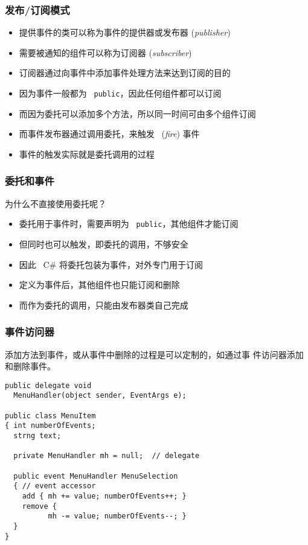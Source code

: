 \begin{frame}
\frametitle{发布/订阅模式}
\begin{itemize}
\item 提供事件的类可以称为事件的提供器或发布器 (\textit{publisher})
\item 需要被通知的组件可以称为订阅器 (\textit{subscriber})
\end{itemize}
\bigskip \pause
\begin{itemize}
\setlength{\itemsep}{4pt plus 1pt}
\item 订阅器通过向事件中添加事件处理方法来达到订阅的目的
\item 因为事件一般都为 ~\texttt{public}，因此任何组件都可以订阅
\item 而因为委托可以添加多个方法，所以同一时间可由多个组件订阅
\item 而事件发布器通过调用委托，来触发 ~(\textit{fire}) 事件
\item 事件的触发实际就是委托调用的过程
\end{itemize}
\end{frame}

\begin{frame}[fragile]
\frametitle{委托和事件}
为什么不直接使用委托呢？
\begin{itemize}
\setlength{\itemsep}{6pt plus 1pt}
\item 委托用于事件时，需要声明为 ~\texttt{public}，其他组件才能订阅
\item 但同时也可以触发，即委托的调用，不够安全
\item 因此 ~C\# 将委托包装为事件，对外专门用于订阅
\item 定义为事件后，其他组件也只能订阅和删除
\item 而作为委托的调用，只能由发布器类自己完成
\end{itemize}
\end{frame}

\begin{frame}
\frametitle{事件访问器}
\CJKindent 添加方法到事件，或从事件中删除的过程是可以定制的，如通过{\redwarn 事
件访问器}添加和删除事件。
\begin{lstlisting}
public delegate void
  MenuHandler(object sender, EventArgs e);

public class MenuItem
{ int numberOfEvents;
  strng text;

  private MenuHandler mh = null;  // delegate

  public event MenuHandler MenuSelection 
  { // event accessor
    add { mh += value; numberOfEvents++; }
    remove {
          mh -= value; numberOfEvents--; }
  }
}

\end{lstlisting}
\end{frame}

